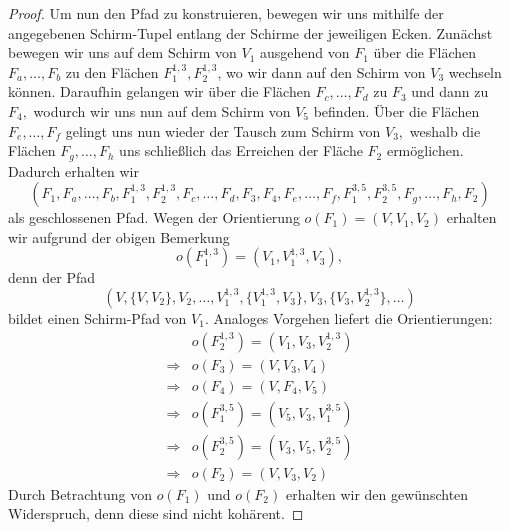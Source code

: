 \documentclass[12pt,titlepage,twoside,cleardoublepage]{article}
\theoremstyle{nummermitklammern}
\numberwithin{equation}{section}
\begin{document}
\begin{proof}
Um nun den Pfad zu konstruieren, bewegen wir uns mithilfe der angegebenen Schirm-Tupel entlang der Schirme der jeweiligen Ecken. Zunächst bewegen wir uns auf dem Schirm von $V_1$ ausgehend von $F_1$ über die Flächen $F_a,\ldots,F_b$ zu den Flächen $F_1^{1,3},F_2^{1,3}$, wo wir dann auf den Schirm von $V_3$ wechseln können. Daraufhin gelangen wir über die Flächen $F_c,\ldots,F_d$ zu $F_3$ und dann zu $F_4,$ wodurch wir uns nun auf dem Schirm von $V_5$ befinden. Über die Flächen $F_e,\ldots,F_f$ gelingt uns nun wieder der Tausch zum Schirm von $V_3,$ weshalb die Flächen $F_g,\ldots,F_h$ uns schließlich das Erreichen der Fläche $F_2$ ermöglichen.  
Dadurch erhalten wir 
\[
(F_1,F_a,\ldots,F_b,F^{1,3}_1,F^{1,3}_2,F_c,\ldots,F_d,F_3,F_4,F_e,\ldots,F_f,F_1^{3,5},F_2^{3,5},F_g,\ldots,F_h,F_2)
\]
als geschlossenen Pfad.
Wegen der Orientierung $o(F_1)=(V,V_1,V_2)$ erhalten wir aufgrund der obigen Bemerkung \label{tup}
\[
o(F_1^{1,3})=(V_1,V_1^{1,3},V_3),
\] 
denn der Pfad 
\[
(V,\{V,V_2\},V_2,\ldots, V_1^{1,3},\{V_1^{1,3},V_3\},V_3,\{V_3,V_2^{1,3}\},\ldots)
\] bildet einen Schirm-Pfad von $V_1.$
Analoges Vorgehen liefert die Orientierungen:
\begin{align*}
&o(F_2^{1,3})=(V_1,V_3,V_2^{1,3})\\
\Rightarrow&o(F_3)=(V,V_3,V_4)\\
\Rightarrow&o(F_4)=(V,F_4,V_5)\\
\Rightarrow&o(F_1^{3,5})=(V_5,V_3,V_1^{3,5})\\
\Rightarrow&o(F_2^{3,5})=(V_3,V_5,V_2^{3,5})\\
\Rightarrow&o(F_2)=(V,V_3,V_2)
\end{align*}
Durch Betrachtung von $o(F_1)$ und $o(F_2)$ erhalten wir den gewünschten Widerspruch, denn diese sind nicht kohärent.
\end{proof}
\end{document}
